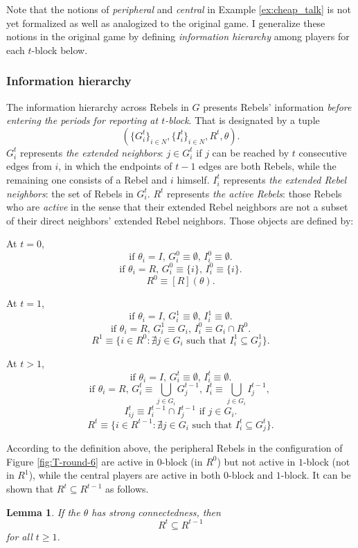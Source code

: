 \documentclass[12pt,letter]{article}
\newtheorem{lemma}{Lemma}[section]
\theoremstyle{definition}
\theoremstyle{remark}
\theoremstyle{claim}
\begin{document}
Note that the notions of \textit{peripheral} and \textit{central} in Example \ref{ex:cheap_talk} is not yet formalized as well as analogized to the original game. I generalize these notions in the original game by defining \textit{information hierarchy} among players for each $t$-block below.


\subsubsection{Information hierarchy}
\label{sec:info}
The information hierarchy across Rebels in $G$ presents Rebels' information \textit{before entering the periods for reporting at $t$-block}. That is designated by a tuple \[(\{G^{t}_i\}_{i\in N}, \{I^{t}_i\}_{i\in N}, R^t,\theta).\]
$G^{t}_i$ represents \textit{the extended neighbors}: $j\in G^{t}_i$ if $j$ can be reached by $t$ consecutive edges from $i$, in which the endpoints of $t-1$ edges are both Rebels, while the remaining one consists of a Rebel and $i$ himself. $I^{t}_i$ represents \textit{the extended Rebel neighbors}: the set of Rebels in $G^t_i$. $R^t$ represents \textit{the active Rebels}: those Rebels who are \textit{active} in the sense that their extended Rebel neighbors are not a subset of their direct neighbors' extended Rebel neighbors. Those objects are defined by:

At $t=0$,
\[\text{if $\theta_i=I$, $G^{0}_i\equiv \emptyset$, $I^{0}_i\equiv \emptyset$.}\] 
\[\text{if $\theta_i=R$, $G^{0}_i\equiv \{i\}$, $I^{0}_i\equiv \{i\}$.}\] 
\[\text{$R^0\equiv [R](\theta)$.}\] 

At $t=1$,
\[\text{if $\theta_i=I$, $G^{1}_i\equiv \emptyset$, $I^{1}_i\equiv \emptyset$.}\] 
\[\text{if $\theta_i=R$, $G^{1}_i\equiv G_i$, $I^{0}_i\equiv G_i\cap R^0$.}\] 
\[\text{$R^1\equiv \{i\in R^0: \nexists j\in G_i \text{ such that }I^1_i\subseteq G^1_j\}$.}\] 

At $t>1$, 
\[\text{if $\theta_i=I$, $G^{t}_i\equiv \emptyset$, $I^{t}_i\equiv \emptyset$.}\] 
\[\text{if $\theta_i=R$, $G^{t}_i\equiv \bigcup_{j\in G_i} G^{t-1}_j$, $I^{t}_i\equiv \bigcup_{j\in G_i} I^{t-1}_j$, }\] 
\[\text{$I^{t}_{ij}\equiv I^{t-1}_i\cap I^{t-1}_j$ if $j\in G_i$.}\]
\[\text{$R^t\equiv \{i\in R^{t-1}: \nexists j\in G_i \text{ such that }I^t_i\subseteq G^t_j\}$.}\]



According to the definition above, the peripheral Rebels in the configuration of Figure \ref{fig:T-round-6} are active in $0$-block (in $R^0$) but not active in $1$-block (not in $R^1$), while the central players are active in both $0$-block and $1$-block. It can be shown that $R^t\subseteq R^{t-1}$ as follows. 
\begin{lemma}
\label{lemma_inclusion}
If the $\theta$ has strong connectedness, then 
\[R^t\subseteq R^{t-1}\] for all $t\geq 1$.
\end{lemma}
\end{document}
